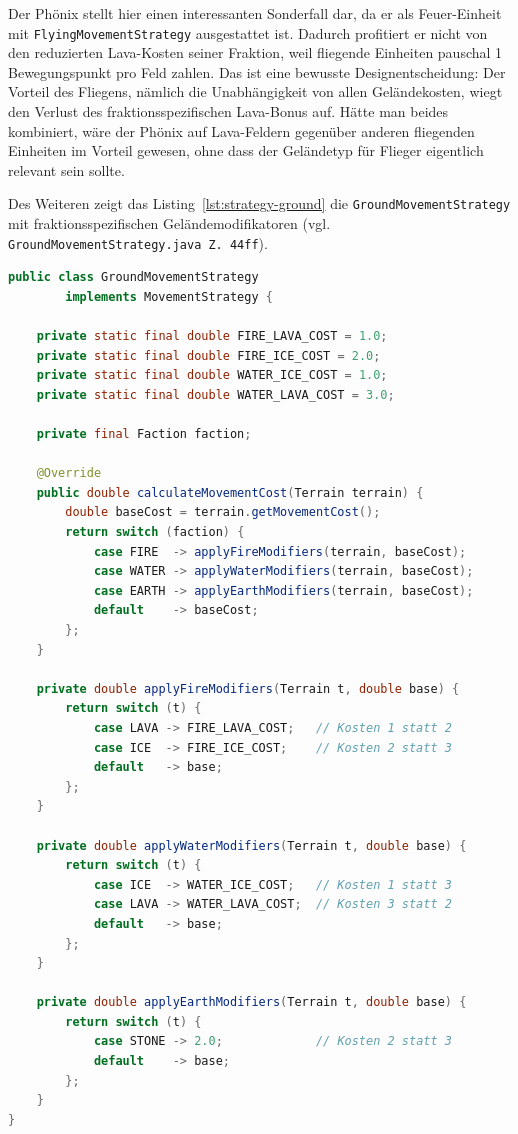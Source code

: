 Der Phönix stellt hier einen interessanten Sonderfall dar, da er als Feuer-Einheit mit \texttt{FlyingMovementStrategy}
ausgestattet ist. Dadurch profitiert er nicht von den reduzierten Lava-Kosten seiner Fraktion, weil fliegende Einheiten
pauschal 1 Bewegungspunkt pro Feld zahlen. Das ist eine bewusste Designentscheidung: Der Vorteil des Fliegens, nämlich die
Unabhängigkeit von allen Geländekosten, wiegt den Verlust des fraktionsspezifischen Lava-Bonus auf. Hätte man beides kombiniert,
wäre der Phönix auf Lava-Feldern gegenüber anderen fliegenden Einheiten im Vorteil gewesen, ohne dass der Geländetyp für
Flieger eigentlich relevant sein sollte.

Des Weiteren zeigt das Listing~\ref{lst:strategy-ground} die \texttt{GroundMovementStrategy} mit fraktionsspezifischen Geländemodifikatoren (vgl. \texttt{GroundMovementStrategy.java Z.\,44ff}).

\begin{lstlisting}[language=Java, caption={GroundMovementStrategy -- fraktionsspezifische Geländekosten}, label={lst:strategy-ground}]
public class GroundMovementStrategy
        implements MovementStrategy {

    private static final double FIRE_LAVA_COST = 1.0;
    private static final double FIRE_ICE_COST = 2.0;
    private static final double WATER_ICE_COST = 1.0;
    private static final double WATER_LAVA_COST = 3.0;

    private final Faction faction;

    @Override
    public double calculateMovementCost(Terrain terrain) {
        double baseCost = terrain.getMovementCost();
        return switch (faction) {
            case FIRE  -> applyFireModifiers(terrain, baseCost);
            case WATER -> applyWaterModifiers(terrain, baseCost);
            case EARTH -> applyEarthModifiers(terrain, baseCost);
            default    -> baseCost;
        };
    }

    private double applyFireModifiers(Terrain t, double base) {
        return switch (t) {
            case LAVA -> FIRE_LAVA_COST;   // Kosten 1 statt 2
            case ICE  -> FIRE_ICE_COST;    // Kosten 2 statt 3
            default   -> base;
        };
    }

    private double applyWaterModifiers(Terrain t, double base) {
        return switch (t) {
            case ICE  -> WATER_ICE_COST;   // Kosten 1 statt 3
            case LAVA -> WATER_LAVA_COST;  // Kosten 3 statt 2
            default   -> base;
        };
    }

    private double applyEarthModifiers(Terrain t, double base) {
        return switch (t) {
            case STONE -> 2.0;             // Kosten 2 statt 3
            default    -> base;
        };
    }
}
\end{lstlisting}

